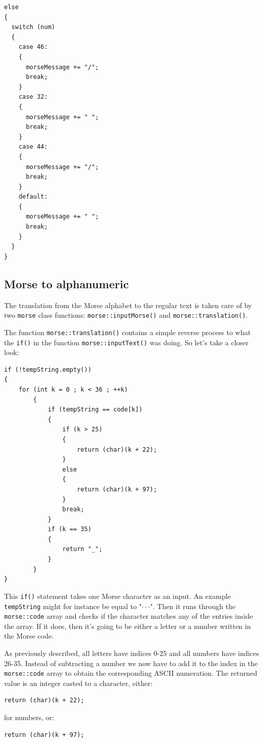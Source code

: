 \documentclass[12pt]{report}
\begin{document}
\newpage

\begin{lstlisting}
else
{
  switch (num)
  {
    case 46:
    {
      morseMessage += "/";
      break;
    }
    case 32:
    {
      morseMessage += " ";
      break;
    }
    case 44:
    {
      morseMessage += "/";
      break;
    }
    default:
    {
      morseMessage += " ";
      break;
    }
  }
}
\end{lstlisting}


\subsection{Morse to alphanumeric}

The translation from the Morse alphabet to the regular text is taken care of by two \verb|morse| class functions: \verb|morse::inputMorse()| and \verb|morse::translation()|.

The function \verb|morse::translation()| contains a simple reverse process to what the \verb|if()| in the function \verb|morse::inputText()| was doing. So let's take a closer look:

\begin{lstlisting}
if (!tempString.empty())
{
	for (int k = 0 ; k < 36 ; ++k)
		{
			if (tempString == code[k])
			{
				if (k > 25)
				{
					return (char)(k + 22);
				}
				else	
				{
					return (char)(k + 97);
				}
				break;
			}
			if (k == 35)	
			{
				return "_";
			}
		}
}
\end{lstlisting}

This \verb|if()| statement takes one Morse character as an input. An example \verb|tempString| might for instance be equal to "$\cdot\cdot$\text{-}$\cdot$". Then it runs through the \verb|morse::code| array and checks if the character matches any of the entries inside the array. If it does, then it's going to be either a letter or a number written in the Morse code.

As previously described, all letters have indices 0-25 and all numbers have indices 26-35. Instead of subtracting a number we now have to add it to the index in the \verb|morse::code| array to obtain the corresponding ASCII numeration. The returned value is an integer casted to a character, either:

\begin{lstlisting}
return (char)(k + 22);
\end{lstlisting}

for numbers, or:

\begin{lstlisting}
return (char)(k + 97);
\end{lstlisting}
\end{document}
